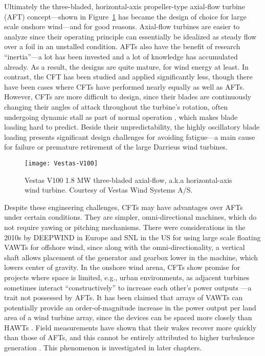Ultimately the three-bladed, horizontal-axis propeller-type axial-flow turbine
(AFT) concept---shown in Figure~\ref{fig:AFT} has became the design of choice
for large scale onshore wind---and for good reasons. Axial-flow turbines are
easier to analyze since their operating principle can essentially be idealized
as steady flow over a foil in an unstalled condition. AFTs also have the benefit
of research ``inertia''---a lot has been invested and a lot of knowledge has
accumulated already. As a result, the designs are quite mature, for wind energy
at least. In contrast, the CFT has been studied and applied significantly less,
though there have been cases where CFTs have performed nearly equally as well as
AFTs. However, CFTs are more difficult to design, since their blades are
continuously changing their angles of attack throughout the turbine's rotation,
often undergoing dynamic stall as part of normal operation \cite{Para2002},
which makes blade loading hard to predict. Beside their unpredictability, the
highly oscillatory blade loading presents significant design challenges for
avoiding fatigue---a main cause for failure or premature retirement of the large
Darrieus wind turbines.


\begin{figure}
    \centering

    \texttt{[image: Vestas-V100]}

    \caption{Vestas V100 1.8 MW three-bladed axial-flow, a.k.a horizontal-axis
        wind turbine. Courtesy of Vestas Wind Systems A/S.}

    \label{fig:AFT}
\end{figure}

Despite these engineering challenges, CFTs may have advantages over AFTs under
certain conditions. They are simpler, omni-directional machines, which do not
require yawing or pitching mechanisms. There were considerations in the 2010s by
DEEPWIND in Europe \cite{Paulsen2011} and SNL \cite{Sandia2012} in the US for
using large scale floating VAWTs for offshore wind, since along with the
omni-directionality, a vertical shaft allows placement of the generator and
gearbox lower in the machine, which lowers center of gravity. In the onshore
wind arena, CFTs show promise for projects where space is limited, e.g., urban
environments, as adjacent turbines sometimes interact ``constructively'' to
increase each other's power outputs \cite{Li2010}---a trait not possessed by
AFTs. It has been claimed that arrays of VAWTs can potentially provide an
order-of-magnitude increase in the power output per land area of a wind turbine
array, since the devices can be spaced more closely than HAWTs
\cite{Dabiri2011}. Field measurements have shown that their wakes recover more
quickly than those of AFTs, and this cannot be entirely attributed to higher
turbulence generation \cite{Kinzel2012}. This phenomenon is investigated in
later chapters.

